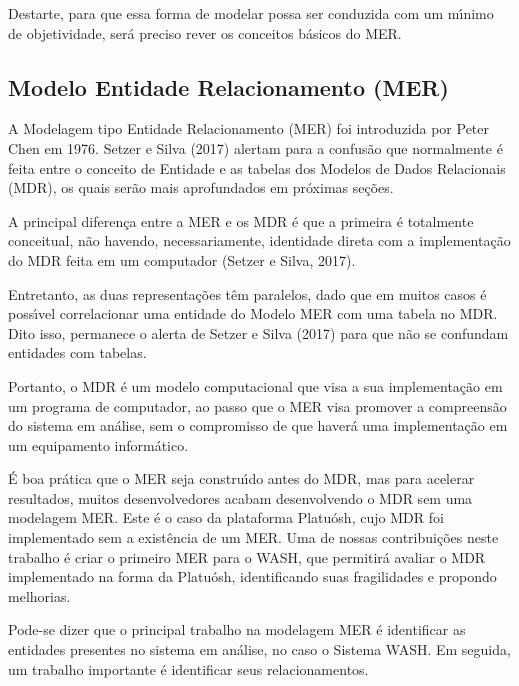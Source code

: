 \documentclass[
12pt,		%
openright,	%
twoside,  %
a4paper,			%
chapter=TITLE,		%
english,			%
french,				%
spanish,			%
brazil				%
]{USPSC-classe/USPSC}
\begin{document}
Destarte, para que essa forma de modelar possa ser conduzida com um m\'{\i}nimo de objetividade, ser\'a preciso rever os conceitos b\'asicos do MER.




\subsection[Modelo Entidade Relacionamento (MER)]{Modelo Entidade Relacionamento (MER)}\label{Modelo Entidade Relacionamento (MER)}
A Modelagem tipo Entidade Relacionamento (MER) foi introduzida por Peter Chen em 1976. Setzer e Silva (2017) alertam para a confus\~ao que normalmente \'e feita entre o conceito de Entidade e as tabelas dos Modelos de Dados Relacionais (MDR), os quais ser\~ao mais aprofundados em pr\'oximas se\c{c}\~oes.




A principal diferen\c{c}a entre a MER e os MDR \'e que a primeira \'e totalmente conceitual, n\~ao havendo, necessariamente, identidade direta com a implementa\c{c}\~ao do MDR feita em um computador  (Setzer e Silva, 2017).




Entretanto, as duas representa\c{c}\~oes t\^em paralelos, dado que em muitos casos \'e poss\'{\i}vel correlacionar uma entidade do Modelo MER com uma tabela no MDR. Dito isso, permanece o alerta de  Setzer e Silva (2017) para que n\~ao se confundam entidades com tabelas.




Portanto, o MDR \'e um modelo computacional que visa a sua implementa\c{c}\~ao em um programa de computador, ao passo que o MER visa promover a compreens\~ao do sistema em an\'alise, sem o compromisso de que haver\'a uma implementa\c{c}\~ao em um equipamento inform\'atico.




\'E boa pr\'atica que o MER seja constru\'{\i}do antes do MDR, mas para acelerar resultados, muitos desenvolvedores acabam desenvolvendo o MDR sem uma modelagem MER. Este \'e o caso da plataforma Platu\'osh, cujo MDR foi implementado sem a exist\^encia de um MER. Uma de nossas contribui\c{c}\~oes neste trabalho \'e criar o primeiro MER para o WASH, que permitir\'a avaliar o MDR implementado na forma da Platu\'osh, identificando suas fragilidades e propondo melhorias.




Pode-se dizer que o principal trabalho na modelagem MER \'e identificar as entidades presentes no sistema em an\'alise, no caso o Sistema WASH. Em seguida, um trabalho importante \'e identificar seus relacionamentos.
\end{document}
